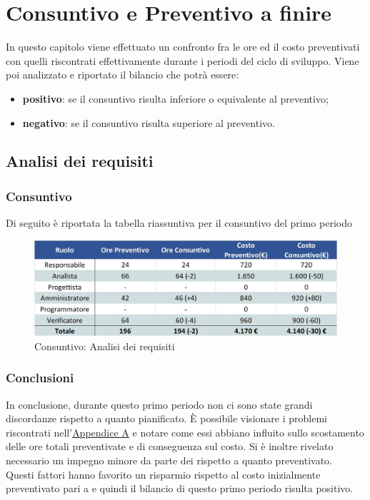 \newpage
\section{Consuntivo e Preventivo a finire}

In questo capitolo viene effettuato un confronto fra le ore ed il costo preventivati con quelli riscontrati effettivamente durante i periodi del ciclo di sviluppo.
Viene poi analizzato e riportato il bilancio che potrà essere:
\begin{itemize}
	\item \textbf{positivo}: se il consuntivo risulta inferiore o equivalente al preventivo;
	\item \textbf{negativo}: se il consuntivo risulta superiore al preventivo.
\end{itemize}

\subsection{Analisi dei requisiti}
\subsubsection{Consuntivo}
Di seguito è riportata la tabella riassuntiva per il consuntivo del primo periodo
\begin{figure}[h!]
	\centerline{\includegraphics[scale=0.55]{img/Preventivo/AnalisiRequisitiConsuntivo.jpg}}
	\caption{Consuntivo: Analisi dei requisiti}
\end{figure}

\subsubsection{Conclusioni}
In conclusione, durante questo primo periodo non ci sono state grandi discordanze rispetto a quanto pianificato. È possibile visionare i problemi riscontrati nell'\hyperref[RiscontroRischi]{Appendice A} e notare come essi abbiano influito sullo scostamento delle ore totali preventivate e di conseguenza sul costo. Si è inoltre rivelato necessario un impegno minore da parte dei \vers{} rispetto a quanto preventivato.\\
Questi fattori hanno favorito un risparmio rispetto al costo inizialmente preventivato pari a  e quindi il bilancio di questo primo periodo risulta positivo.
